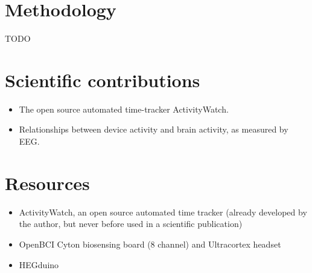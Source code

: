 \documentclass{IEEEtran}
\begin{document}
\section{Methodology}

\large TODO

\section{Scientific contributions}

\begin{itemize}
  \item The open source automated time-tracker ActivityWatch.
  \item Relationships between device activity and brain activity, as measured by EEG\@.
\end{itemize}


\section{Resources}

\begin{itemize}
  \item ActivityWatch, an open source automated time tracker (already developed by the author, but never before used in a scientific publication)
  \item OpenBCI Cyton biosensing board (8 channel) and Ultracortex headset
  \item HEGduino
\end{itemize}




\endrefsegment

  {\list
     {}
     {\setlength{\leftmargin}{\bibhang}%
      \setlength{\itemindent}{-\leftmargin}%
      \setlength{\itemsep}{\bibitemsep}%
      \setlength{\parsep}{\bibparsep}}}
  {\endlist}
  {\item}
\nocite{*}
\printbibheading{}
\bibbysegment[heading=subbibliography]
\printbibliography[notcategory=cited, env=bibnonum, heading=notcited]
\end{document}
